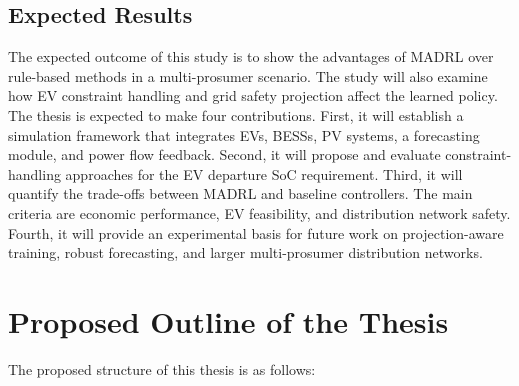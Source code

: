 \documentclass[12pt,a4paper]{ctexart}
\begin{document}
\subsection{Expected Results}

The expected outcome of this study is to show the advantages of MADRL over rule-based methods in a multi-prosumer scenario. The study will also examine how EV constraint handling and grid safety projection affect the learned policy. The thesis is expected to make four contributions. First, it will establish a simulation framework that integrates EVs, BESSs, PV systems, a forecasting module, and power flow feedback. Second, it will propose and evaluate constraint-handling approaches for the EV departure SoC requirement. Third, it will quantify the trade-offs between MADRL and baseline controllers. The main criteria are economic performance, EV feasibility, and distribution network safety. Fourth, it will provide an experimental basis for future work on projection-aware training, robust forecasting, and larger multi-prosumer distribution networks.

\section{Proposed Outline of the Thesis}

The proposed structure of this thesis is as follows:
\end{document}
